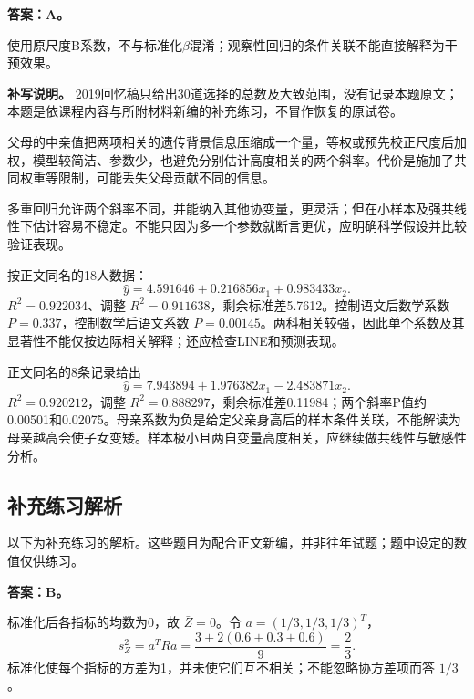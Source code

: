 
\textbf{答案：A。}

使用原尺度B系数，不与标准化\(\beta\)混淆；观察性回归的条件关联不能直接解释为干预效果。


\textbf{补写说明。} 2019回忆稿只给出30道选择的总数及大致范围，没有记录本题原文；本题是依课程内容与所附材料新编的补充练习，不冒作恢复的原试卷。



父母的中亲值把两项相关的遗传背景信息压缩成一个量，等权或预先校正尺度后加权，模型较简洁、参数少，也避免分别估计高度相关的两个斜率。代价是施加了共同权重等限制，可能丢失父母贡献不同的信息。

多重回归允许两个斜率不同，并能纳入其他协变量，更灵活；但在小样本及强共线性下估计容易不稳定。不能只因为多一个参数就断言更优，应明确科学假设并比较验证表现。



按正文同名的18人数据： \[\widehat y=4.591646+0.216856x_1+0.983433x_2.\] \(R^2=0.922034\)、调整 \(R^2=0.911638\)，剩余标准差5.7612。控制语文后数学系数 \(P=0.337\)，控制数学后语文系数 \(P=0.00145\)。两科相关较强，因此单个系数及其显著性不能仅按边际相关解释；还应检查LINE和预测表现。



正文同名的8条记录给出 \[\widehat y=7.943894+1.976382x_1-2.483871x_2.\] \(R^2=0.920212\)，调整 \(R^2=0.888297\)，剩余标准差0.11984；两个斜率P值约0.00501和0.02075。母亲系数为负是给定父亲身高后的样本条件关联，不能解读为母亲越高会使子女变矮。样本极小且两自变量高度相关，应继续做共线性与敏感性分析。

\clearpage\subsection*{补充练习解析}

以下为补充练习的解析。这些题目为配合正文新编，并非往年试题；题中设定的数值仅供练习。


\textbf{答案：B。}

标准化后各指标的均数为0，故 \(\bar Z=0\)。令 \(a=(1/3,1/3,1/3)^T\)， \[s_Z^2=a^TRa=\frac{3+2(0.6+0.3+0.6)}9=\frac23.\] 标准化使每个指标的方差为1，并未使它们互不相关；不能忽略协方差项而答 \(1/3\)。





